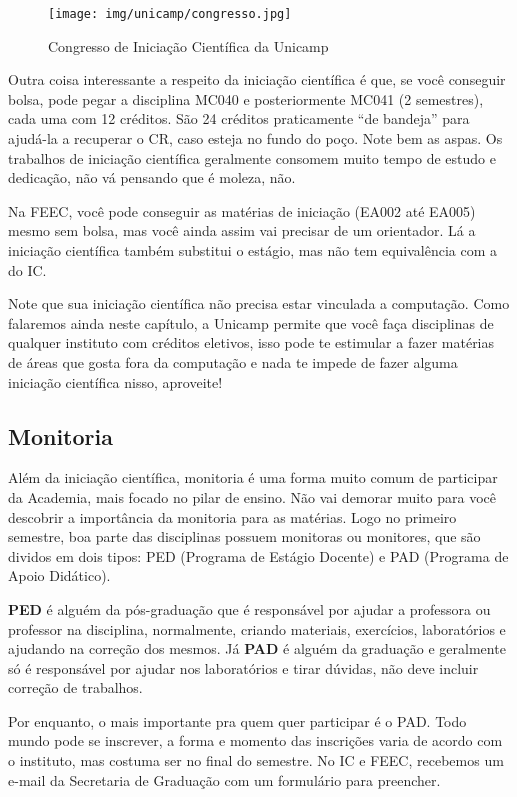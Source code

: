 \begin{figure}[h!]
  \centering
  \texttt{[image: img/unicamp/congresso.jpg]}
  \caption*{Congresso de Iniciação Científica da Unicamp}
\end{figure}

Outra coisa interessante a respeito da iniciação científica é que, se você
conseguir bolsa, pode pegar a disciplina MC040 e posteriormente MC041 (2
semestres), cada uma com 12 créditos. São 24 créditos praticamente ``de
bandeja'' para ajudá-la a recuperar o CR, caso esteja no fundo do poço. Note
bem as aspas. Os trabalhos de iniciação científica geralmente consomem muito
tempo de estudo e dedicação, não vá pensando que é moleza, não.

Na FEEC, você pode conseguir as matérias de iniciação (EA002 até EA005) mesmo
sem bolsa, mas você ainda assim vai precisar de um orientador. Lá a iniciação
científica também substitui o estágio, mas não tem equivalência com a do IC.

Note que sua iniciação científica não precisa estar vinculada a computação.
Como falaremos ainda neste capítulo, a Unicamp permite que você faça
disciplinas de qualquer instituto com créditos eletivos, isso pode te estimular
a fazer matérias de áreas que gosta fora da computação e nada te impede de
fazer alguma iniciação científica nisso, aproveite!

\subsection{Monitoria}

Além da iniciação científica, monitoria é uma forma muito comum de participar
da Academia, mais focado no pilar de ensino. Não vai demorar muito para você
descobrir a importância da monitoria para as matérias. Logo no primeiro
semestre, boa parte das disciplinas possuem monitoras ou monitores, que são
dividos em dois tipos: PED (Programa de Estágio Docente) e PAD (Programa de
Apoio Didático).

\textbf{PED} é alguém da pós-graduação que é responsável por ajudar a
professora ou professor na disciplina, normalmente, criando materiais,
exercícios, laboratórios e ajudando na correção dos mesmos. Já \textbf{PAD} é
alguém da graduação e geralmente só é responsável por ajudar nos laboratórios e
tirar dúvidas, não deve incluir correção de trabalhos.

Por enquanto, o mais importante pra quem quer participar é o PAD. Todo mundo
pode se inscrever, a forma e momento das inscrições varia de acordo com o
instituto, mas costuma ser no final do semestre. No IC e FEEC, recebemos um
e-mail da Secretaria de Graduação com um formulário para preencher.

